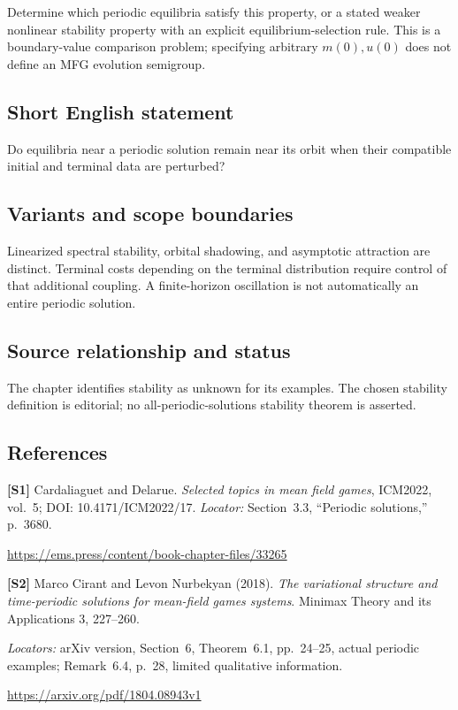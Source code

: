 \documentclass[11pt,a4paper]{article}
\begin{document}
Determine which periodic equilibria satisfy this property, or a stated weaker nonlinear stability property with an explicit equilibrium-selection rule. This is a boundary-value comparison problem; specifying arbitrary $m(0),u(0)$ does not define an MFG evolution semigroup.
\subsection*{Short English statement}
Do equilibria near a periodic solution remain near its orbit when their compatible initial and terminal data are perturbed?
\subsection*{Variants and scope boundaries}
Linearized spectral stability, orbital shadowing, and asymptotic attraction are distinct. Terminal costs depending on the terminal distribution require control of that additional coupling. A finite-horizon oscillation is not automatically an entire periodic solution.
\subsection*{Source relationship and status}
The chapter identifies stability as unknown for its examples. The chosen stability definition is editorial; no all-periodic-solutions stability theorem is asserted.
\subsection*{References}
\begingroup\footnotesize\raggedright
{\footnotesize\raggedright
\textbf{[S1]} Cardaliaguet and Delarue. \emph{Selected topics in mean field games}, ICM2022, vol.~5; DOI: 10.4171/ICM2022/17. \textit{Locator:} Section~3.3, ``Periodic solutions,'' p.~3680.\par
\url{https://ems.press/content/book-chapter-files/33265}\par\smallskip
\textbf{[S2]} Marco Cirant and Levon Nurbekyan (2018). \emph{The variational structure and time-periodic solutions for mean-field games systems}. Minimax Theory and its Applications 3, 227--260.\par
\textit{Locators:} arXiv version, Section~6, Theorem~6.1, pp.~24--25, actual periodic examples; Remark~6.4, p.~28, limited qualitative information.\par
\url{https://arxiv.org/pdf/1804.08943v1}\par}
\par\endgroup
\end{document}
